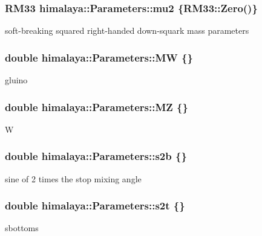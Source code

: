 \subsubsection[{\texorpdfstring{mu2}{mu2}}]{\setlength{\rightskip}{0pt plus 5cm}R\+M33 himalaya\+::\+Parameters\+::mu2 \{R\+M33\+::\+Zero()\}}\hypertarget{structhimalaya_1_1Parameters_a2b2c94041a50cae06d1488dd403fec07}{}\label{structhimalaya_1_1Parameters_a2b2c94041a50cae06d1488dd403fec07}
soft-\/breaking squared right-\/handed down-\/squark mass parameters 
\subsubsection[{\texorpdfstring{MW}{MW}}]{\setlength{\rightskip}{0pt plus 5cm}double himalaya\+::\+Parameters\+::\+MW \{\}}\hypertarget{structhimalaya_1_1Parameters_a901124ec812d32656ed0a1cc7b3ae07c}{}\label{structhimalaya_1_1Parameters_a901124ec812d32656ed0a1cc7b3ae07c}
gluino 
\subsubsection[{\texorpdfstring{MZ}{MZ}}]{\setlength{\rightskip}{0pt plus 5cm}double himalaya\+::\+Parameters\+::\+MZ \{\}}\hypertarget{structhimalaya_1_1Parameters_adab7c0a5e2ea82e8a6ce209e424e3254}{}\label{structhimalaya_1_1Parameters_adab7c0a5e2ea82e8a6ce209e424e3254}
W 
\subsubsection[{\texorpdfstring{s2b}{s2b}}]{\setlength{\rightskip}{0pt plus 5cm}double himalaya\+::\+Parameters\+::s2b \{\}}\hypertarget{structhimalaya_1_1Parameters_ae6574cf2bb33e968f3285167941cd696}{}\label{structhimalaya_1_1Parameters_ae6574cf2bb33e968f3285167941cd696}
sine of 2 times the stop mixing angle 
\subsubsection[{\texorpdfstring{s2t}{s2t}}]{\setlength{\rightskip}{0pt plus 5cm}double himalaya\+::\+Parameters\+::s2t \{\}}\hypertarget{structhimalaya_1_1Parameters_a0f85389598077341d20683c371a8d1be}{}\label{structhimalaya_1_1Parameters_a0f85389598077341d20683c371a8d1be}
sbottoms 
